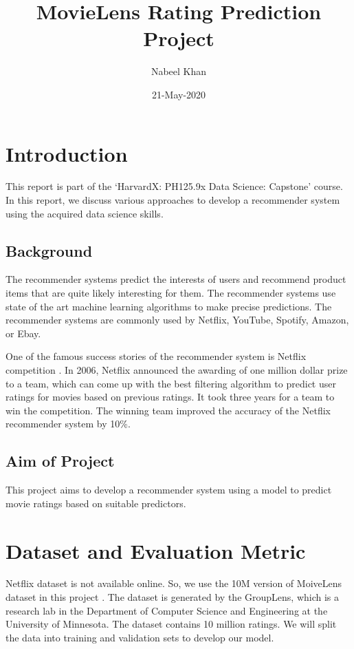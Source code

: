 \documentclass[]{article}
\title{MovieLens Rating Prediction Project}
\author{Nabeel Khan}
\date{21-May-2020}
\begin{document}
\maketitle

{
\setcounter{tocdepth}{2}
\tableofcontents
}
\section{Introduction} 
\label{sec:introduction}

This report is part of the `HarvardX: PH125.9x Data Science: Capstone'
course. In this report, we discuss various approaches to develop a
recommender system using the acquired data science skills.

\subsection{Background} 
\label{sec:background}

The recommender systems predict the interests of users and recommend
product items that are quite likely interesting for
them\cite{rsystems,rsystems1}. The recommender systems use state of the
art machine learning algorithms to make precise predictions. The
recommender systems are commonly used by Netflix, YouTube, Spotify,
Amazon, or Ebay.

One of the famous success stories of the recommender system is Netflix
competition \cite{nfc}. In 2006, Netflix announced the awarding of one
million dollar prize to a team, which can come up with the best
filtering algorithm to predict user ratings for movies based on previous
ratings. It took three years for a team to win the competition. The
winning team improved the accuracy of the Netflix recommender system by
10\%.

\subsection{Aim of Project} 
\label{sec:projectaim}

This project aims to develop a recommender system using a model to
predict movie ratings based on suitable predictors.

\section{Dataset and Evaluation Metric} 
\label{sec:datasetmetric}

Netflix dataset is not available online. So, we use the 10M version of
MoiveLens dataset in this project \cite{dataset}. The dataset is
generated by the GroupLens, which is a research lab in the Department of
Computer Science and Engineering at the University of Minnesota. The
dataset contains 10 million ratings. We will split the data into
training and validation sets to develop our model.
\end{document}
